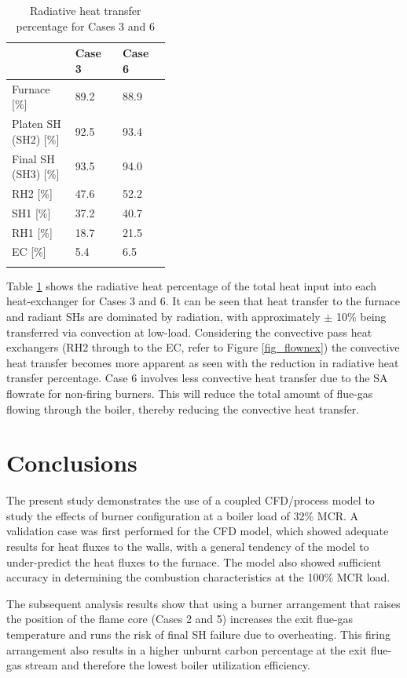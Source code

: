 \documentclass[twocolumn,10pt]{asme2ej}
\begin{document}
\begin{table}[h!]
\centering
\caption{Radiative heat transfer percentage for Cases 3 and 6}
\vspace{2mm}
{\tabulinesep=1.2mm
\begin{tabularx}{\linewidth}{p{0.4\linewidth} XX}
\hline
 &\textbf{Case 3}&\textbf{Case 6}\\
\hline
Furnace [\%] & 89.2 & 88.9\\
Platen SH (SH2) [\%] & 92.5& 93.4\\
Final SH (SH3) [\%] & 93.5& 94.0\\
RH2 [\%] & 47.6& 52.2\\
SH1 [\%] & 37.2& 40.7\\
RH1 [\%] & 18.7& 21.5\\
EC [\%] & 5.4& 6.5\\
\hline
\label{tbl_rad_conv}
\end{tabularx}}
\vspace{-10mm}
\end{table}
\newpage
Table \ref{tbl_rad_conv} shows the radiative heat percentage of the total heat input into each heat-exchanger for Cases 3 and 6. It can be seen that heat transfer to the furnace and radiant SHs are dominated by radiation, with approximately $\pm$ 10\% being transferred via convection at low-load. Considering the convective pass heat exchangers (RH2 through to the EC, refer to Figure \ref{fig_flownex}) the convective heat transfer becomes more apparent as seen with the reduction in radiative heat transfer percentage. Case 6 involves less convective heat transfer due to the SA flowrate for non-firing burners. This will reduce the total amount of flue-gas flowing through the boiler, thereby reducing the convective heat transfer.
\newpage

\section{Conclusions}
The present study demonstrates the use of a coupled CFD/process model to study the effects of burner configuration at a boiler load of 32\% MCR. A validation case was first performed for the CFD model, which showed adequate results for heat fluxes to the walls, with a general tendency of the model to under-predict the heat fluxes to the furnace. The model also showed sufficient accuracy in determining the combustion characteristics at the 100\% MCR load. 

The subsequent analysis results show that using a burner arrangement that raises the position of the flame core (Cases 2 and 5) increases the exit flue-gas temperature and runs the risk of final SH failure due to overheating. This firing arrangement also results in a higher unburnt carbon percentage at the exit flue-gas stream and therefore the lowest boiler utilization efficiency. 
\end{document}
